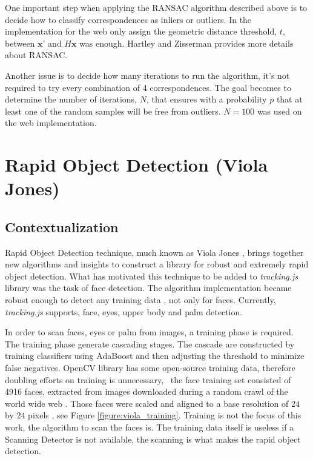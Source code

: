 One important step when applying the RANSAC algorithm described above is to decide how to classify correspondences as inliers or outliers. In the implementation for the web only assign the geometric distance \cite{Homography2009} threshold, $t$, between $\textbf{x'}$ and $H\textbf{x}$ was enough. Hartley and Zisserman \cite{Hartley2004} provides more details about RANSAC.

Another issue is to decide how many iterations to run the algorithm, it's not required to try every combination of 4 correspondences. The goal becomes to determine the number of iterations, $N$, that ensures with a probability $p$ that at least one of the random samples will be free from outliers. $N=100$ was used on the web implementation.



\section{Rapid Object Detection (Viola Jones)} %
\label{sec:tracking_library_for_the_web:rapid_object_detection}

\subsection{Contextualization} %
\label{sub:tracking_library_for_the_web:rapid_object_detection:contextualization}

Rapid Object Detection \cite{Viola2001} technique, much known as Viola Jones \cite{Viola2001}, brings together new algorithms and insights to construct a library for robust and extremely rapid object detection. What has motivated this technique to be added to \textit{tracking.js} library was the task of face detection. The algorithm implementation became robust enough to detect any training data \cite{Viola2001}, not only for faces. Currently, \textit{tracking.js} supports, face, eyes, upper body and palm detection.

In order to scan faces, eyes or palm from images, a training phase is required. The training phase generate cascading stages. The cascade are constructed by training classifiers using AdaBoost \cite{Viola2001} and then adjusting the threshold to minimize false negatives. OpenCV library \cite{Bradski2000} has some open-source training data, therefore doubling efforts on training is unnecessary, \ie\ the face training set consisted of 4916 faces, extracted from images downloaded during a random crawl of the world wide web \cite{Viola2001}. Those faces were scaled and aligned to a base resolution of $24$ by $24$ pixels \cite{Viola2001}, see Figure \ref{figure:viola_training}. Training is not the focus of this work, the algorithm to scan the faces is. The training data itself is useless if a Scanning Detector \cite{Viola2001} is not available, the scanning is what makes the rapid object detection.

